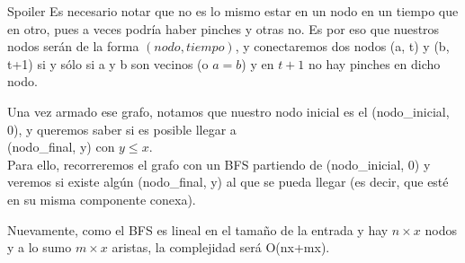 \documentclass[compress]{beamer}
\begin{document}
\begin{frame}{Spoiler}
Es necesario notar que no es lo mismo estar en un nodo en un tiempo que en otro, pues a veces podr\'ia haber pinches y otras no. Es por eso que nuestros nodos ser\'an de la forma $(nodo, tiempo)$, y conectaremos dos nodos (a, t) y (b, t+1) si y s\'olo si a y b son vecinos (o $a=b$) y en $t+1$ no hay pinches en dicho nodo. \bigskip

Una vez armado ese grafo, notamos que nuestro nodo inicial es el (nodo\_inicial, 0), y queremos saber si es posible llegar a \\ (nodo\_final, y) con $y \leq x$. \\ Para ello, recorreremos el grafo con un BFS partiendo de (nodo\_inicial, 0) y veremos si existe alg\'un (nodo\_final, y) al que se pueda llegar (es decir, que est\'e en su misma componente conexa). \bigskip

Nuevamente, como el BFS es lineal en el tama\~no de la entrada y hay $n \times x$ nodos y a lo sumo $m \times x$ aristas, la complejidad ser\'a O(nx+mx).
\end{frame}
\end{document}
